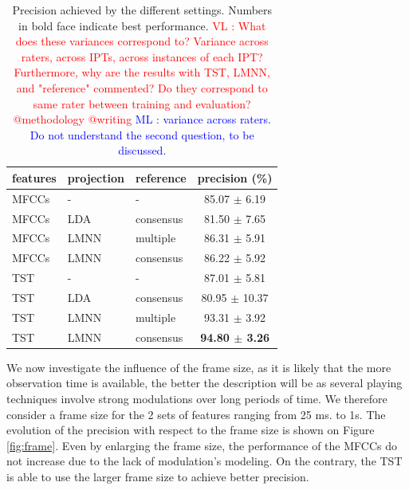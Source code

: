 \documentclass{article}
\newcommand{\ml}[1]{\textcolor{blue}{ML : #1}}
\newcommand{\vl}[1]{\textcolor{red}{VL : #1}}
\begin{document}
\begin{table}
  \caption{Precision achieved by the different settings. Numbers in bold face indicate best performance. \vl{What does these variances correspond to? Variance across raters, across IPTs, across instances of each IPT? Furthermore, why are the results with TST, LMNN, and "reference" commented? Do they correspond to same rater between training and evaluation? @methodology @writing}
  \ml{variance across raters. Do not understand the second question, to be discussed.}}
  \label{tab:res1}
  \begin{center}
\begin{tabular}{lllc}
features & projection & reference & precision (\%) \\
  \hline
  MFCCs & - & - &   85.07 $\pm$ 6.19 \\
  MFCCs & LDA &  consensus  &   81.50 $\pm$ 7.65 \\
MFCCs & LMNN & multiple & 86.31 $\pm$ 5.91 \\
MFCCs & LMNN & consensus &   86.22 $\pm$ 5.92 \\
TST & - & - &   87.01 $\pm$ 5.81 \\
TST & LDA & consensus &   80.95 $\pm$ 10.37 \\
TST & LMNN  & multiple  &   93.31 $\pm$ 3.92 \\
TST & LMNN & consensus &   \textbf{94.80 $\pm$ 3.26} \\
\end{tabular}
\end{center}
\end{table}

We now investigate the influence of the frame size, as it is likely that the more observation time is available, the better the description will be as several playing techniques involve strong modulations over long periods of time. We therefore consider a frame size for the 2 sets of features ranging from 25 ms. to 1s. The evolution of the precision with respect to the frame size is shown on Figure \ref{fig:frame}. Even by enlarging the frame size, the performance of the MFCCs do not increase due to the lack of modulation's modeling. On the contrary, the TST is able to use the larger frame size to achieve better precision.
\end{document}
